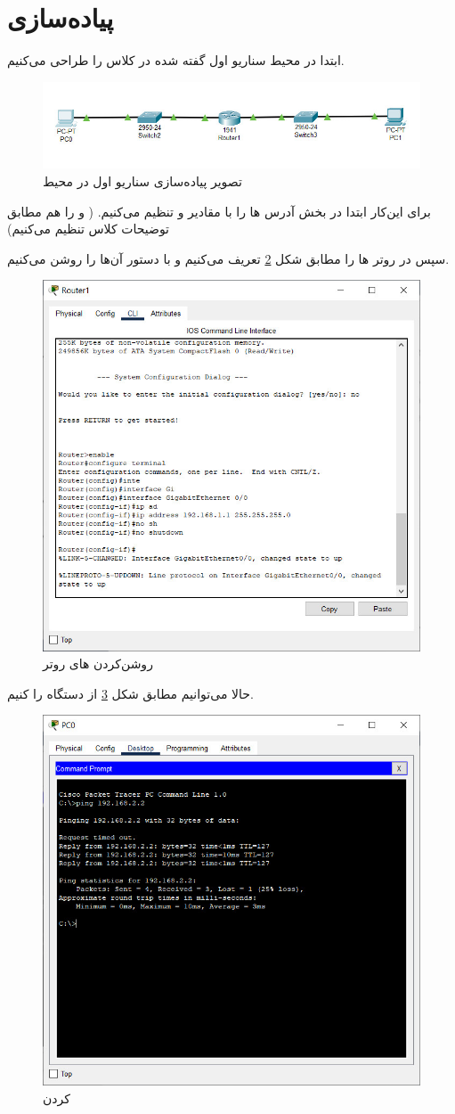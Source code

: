 \documentclass{article}
\newcommand{\code}[1]{\colorbox{codegray}{\texttt{#1}}}
\begin{document}
\section{پیاده‌سازی}
ابتدا در محیط  سناریو اول گفته شده در کلاس را طراحی می‌کنیم.
\begin{figure}[h!]
	\centering
	\includegraphics[width=0.6\columnwidth]{figs/scenario-1.jpg}
	\caption{تصویر پیاده‌سازی سناریو اول در محیط }
	\label{fig:scenario-1}
\end{figure}

برای این‌کار ابتدا در بخش  آدرس ها را با مقادیر \code{} و \code{} تنظیم ‌می‌کنیم. ( و  را هم مطابق توضیحات کلاس تنظیم می‌کنیم)

سپس در روتر ها را مطابق شکل \ref{fig:router-config} تعریف می‌کنیم و با دستور \code{} آن‌ها را روشن می‌کنیم.
\begin{figure}[h!]
	\centering
	\includegraphics[width=0.6\columnwidth]{figs/router-config.jpg}
	\caption{روشن‌کردن های روتر}
	\label{fig:router-config}
\end{figure}

حالا می‌توانیم مطابق شکل \ref{fig:ping-1} از  دستگاه  را  کنیم.
\begin{figure}[h!]
	\centering
	\includegraphics[width=0.6\columnwidth]{figs/ping-1.jpg}
	\caption{ کردن }
	\label{fig:ping-1}
\end{figure}
\end{document}
